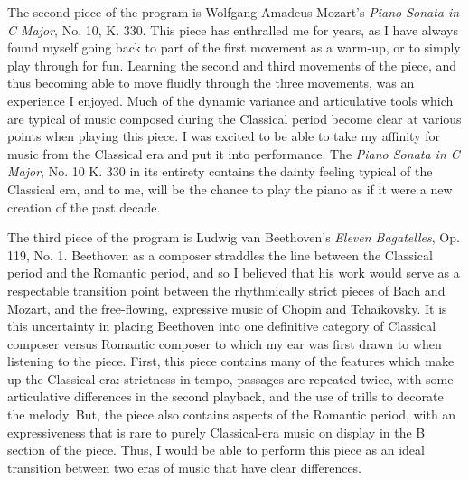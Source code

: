 The second piece of the program is Wolfgang Amadeus Mozart's \textit{Piano Sonata in C Major}, No. 10, K. 330. This piece has enthralled me for years, as I have always found myself going back to part of the first movement as a warm-up, or to simply play through for fun. Learning the second and third movements of the piece, and thus becoming able to move fluidly through the three movements, was an experience I enjoyed. Much of the dynamic variance and articulative tools which are typical of music composed during the Classical period become clear at various points when playing this piece. I was excited to be able to take my affinity for music from the Classical era and put it into performance. The \textit{Piano Sonata in C Major}, No. 10 K. 330 in its entirety contains the dainty feeling typical of the Classical era, and to me, will be the chance to play the piano as if it were a new creation of the past decade. 

The third piece of the program is Ludwig van Beethoven's \textit{Eleven Bagatelles}, Op. 119, No. 1. Beethoven as a composer straddles the line between the Classical period and the Romantic period, and so I believed that his work would serve as a respectable transition point between the rhythmically strict pieces of Bach and Mozart, and the free-flowing, expressive music of Chopin and Tchaikovsky. It is this uncertainty in placing Beethoven into one definitive category of Classical composer versus Romantic composer to which my ear was first drawn to when listening to the piece. First, this piece contains many of the features which make up the Classical era: strictness in tempo, passages are repeated twice, with some articulative differences in the second playback, and the use of trills to decorate the melody. But, the piece also contains aspects of the Romantic period, with an expressiveness that is rare to purely Classical-era music on display in the B section of the piece. Thus, I would be able to perform this piece as an ideal transition between two eras of music that have clear differences.

